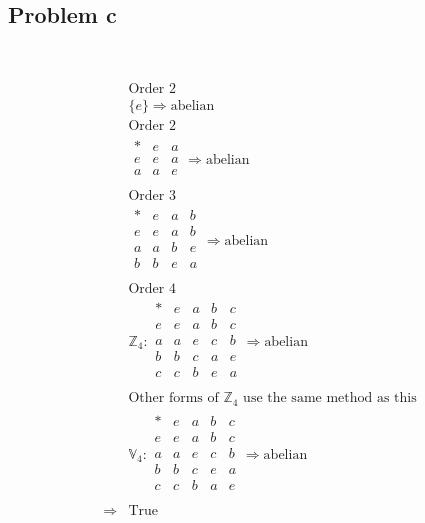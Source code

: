 \documentclass{article}
\begin{document}
~

\subsection*{Problem c}

~

\begin{equation*}
    \begin{split}
        &\text{Order 2}\\
        &\{e\}\Rightarrow \text{abelian}\\
        &\text{Order 2}\\
        &\begin{array}{c|cc}
            \ast&e&a\\
            e&e&a\\
            a&a&e\\
        \end{array} \Rightarrow \text{abelian}\\
        &\text{Order 3}\\
        &\begin{array}{c|ccc}
            \ast&e&a&b\\
            \hline
            e&e&a&b\\
            a&a&b&e\\
            b&b&e&a\\ 
        \end{array}\Rightarrow\text{abelian}\\
        &\text{Order 4}\\
        &\mathbb{Z} _4:\begin{array}{c|cccc}
            \ast&e&a&b&c\\
            e&e&a&b&c\\
            a&a&e&c&b\\
            b&b&c&a&e\\
            c&c&b&e&a\\
        \end{array}\Rightarrow\text{abelian}\\
        &\text{Other forms of }\mathbb{Z} _4\text{ use the same method as this}\\
        &\mathbb{V}_4:\begin{array}{c|cccc}
            \ast&e&a&b&c\\
            \hline
            e&e&a&b&c\\
            a&a&e&c&b\\
            b&b&c&e&a\\
            c&c&b&a&e\\
        \end{array}\Rightarrow\text{abelian}\\
        \Rightarrow&\text{True}\\
    \end{split}
\end{equation*}
\end{document}
